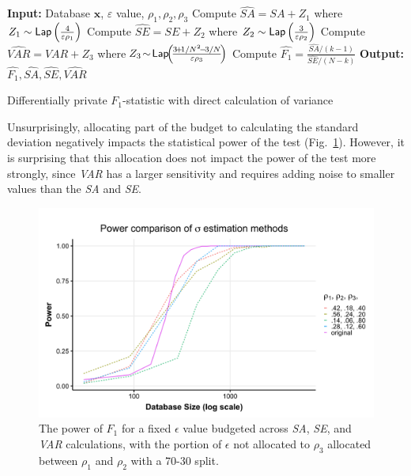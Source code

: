 \documentclass[USenglish,oneside]{article}
\newcounter{ag}
\newcounter{ab}
\newcounter{ar}
\newcounter{igh}
\newcommand{\dbsize}{\ensuremath{N}\xspace}
\newcommand{\eps}{\ensuremath{\varepsilon}\xspace}
\renewcommand{\k}{\ensuremath{k}\xspace}
\newcommand{\lap}{\ensuremath{{\sf Lap}}\xspace}
\newcommand{\se}{\textit{SE}\xspace}
\newcommand{\sa}{\textit{SA}\xspace}
\newcommand{\var}{\textit{VAR}\xspace}
\newcommand{\x}{\ensuremath{\mathbf{x}}\xspace}
\begin{document}
\begin{algorithm}
    \begin{algorithmic}
        \STATE \textbf{Input:} Database \x, $\eps$ value, $\rho_1, \rho_2, \rho_3$
        \STATE Compute $\widehat{\sa} = \sa + Z_1$ where $Z_1\sim \lap\left(\frac{4}{\eps \rho_1}\right)$
        \STATE Compute $\widehat{\se} = \se+ Z_2$ where $Z_2\sim \lap\left(\frac{3}{\eps \rho_2}\right)$
        \STATE Compute $\!\!\widehat{\var} \!\!= \!\!\var \!\!+\! Z_3\!$ where  $\!Z_3 \!\sim\! \lap\!\!\left(\! \frac{3\!+\!1/N^2\! - \!3/N}{\eps\rho_3} \!\right)$
        \STATE Compute $\widehat{F_1} = \frac{\widehat{\sa}/(\k-1)}{\widehat{\se}/(\dbsize-\k)}$
        \STATE \textbf{Output:} $\widehat{F_1}, \widehat{\sa}, \widehat{\se}, \widehat{\var}$
    \end{algorithmic}
    \caption{Differentially private $F_1$-statistic with direct calculation of variance}
     \label{alg:F1hatVar}
\end{algorithm}

Unsurprisingly, allocating part of the budget to calculating the standard deviation negatively impacts the statistical power of the test (Fig.~\ref{Fig:multiple-rhos}). However, it is surprising that this allocation does not impact the power of the test more strongly, since \var has a larger sensitivity and requires adding noise to smaller values than the \sa and \se. 

\begin{figure}[h]
\centering
\includegraphics[width=\linewidth]{images/multiple-rhos.png}
\caption{The power of $F_1$ for a fixed $\epsilon$ value budgeted across \sa, \se, and \var calculations, with the portion of $\epsilon$ not allocated to $\rho_3$ allocated between $\rho_1$ and $\rho_2$ with a 70-30 split.\label{Fig:multiple-rhos}}
\end{figure}
\end{document}
